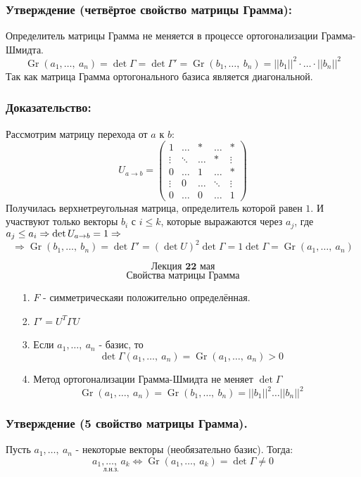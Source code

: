 \documentclass[12pt, letterpaper, twoside]{article}
\begin{document}
    \subsubsection*{Утверждение (четвёртое свойство матрицы Грамма):}
    Определитель матрицы Грамма не меняется в процессе ортогонализации Грамма-Шмидта.
    \[\operatorname{Gr}(a_1,\dots,\ a_n) = \det \Gamma = \det \Gamma' = \operatorname{Gr}(b_1,\dots,\ b_n) = ||b_1||^2\cdot\dots\cdot ||b_n||^2\]
    Так как матрица Грамма ортогонального базиса является диагональной.
    \subsubsection*{Доказательство:}
    Рассмотрим матрицу перехода от $a$ к $b$:
    \[U_{a\to b} = \begin{pmatrix}
        1 & \dots & * &\dots & *\\
        \vdots & \ddots & \dots & * & \vdots\\
        0 & \dots & 1 & \dots & *\\
        \vdots & 0 & \dots & \ddots & \vdots\\
        0 & \dots & 0 & \dots & 1
    \end{pmatrix}\]
    Получилась верхнетреугольная матрица, определитель которой равен $1$. И участвуют только векторы $b_{i}$ с $i\leq k$, которые выражаются через $a_j$, где $a_j \leq a_i\\
    \Rightarrow \det U_{a\to b} = 1\Rightarrow$
    \[\Rightarrow \operatorname{Gr} (b_1,\dots,\ b_n) = \det \Gamma' = (\det U)^2 \det \Gamma = 1\det \Gamma = \operatorname{Gr}(a_1,\dots,\ a_n)\]

\[\textbf{Лекция 22 мая}\]
\[\text{Свойства матрицы Грамма}\]
    \begin{enumerate}
        \item[1.] $F$ - симметрическаяи положительно определённая.
        \item[2.] $\Gamma' = U^T\Gamma U$
        \item[3.] Если $a_1,\dots,\ a_n$ - базис, то
        \[\det \Gamma(a_1,\dots,\ a_n) = \operatorname{Gr}(a_1,\dots,\ a_n) > 0\]
        \item[4.] Метод ортогонализации Грамма-Шмидта не меняет $\det \Gamma$
        \[\operatorname{Gr}(a_1,\dots,\ a_n) = \operatorname{Gr}(b_1,\dots,\ b_n) = ||b_1||^2\dots ||b_n||^2\]  
    \end{enumerate}
    \subsubsection*{Утверждение (5 свойство матрицы Грамма).}
    Пусть $a_1,\dots,\ a_n$ - некоторые векторы (необязательно базис). Тогда:
    \[\underset{\text{л.н.з.}}{a_1,\dots,\ a_k}\Leftrightarrow \operatorname{Gr}(a_1,\dots,\ a_k) = \det \Gamma \neq 0\]
\end{document}
